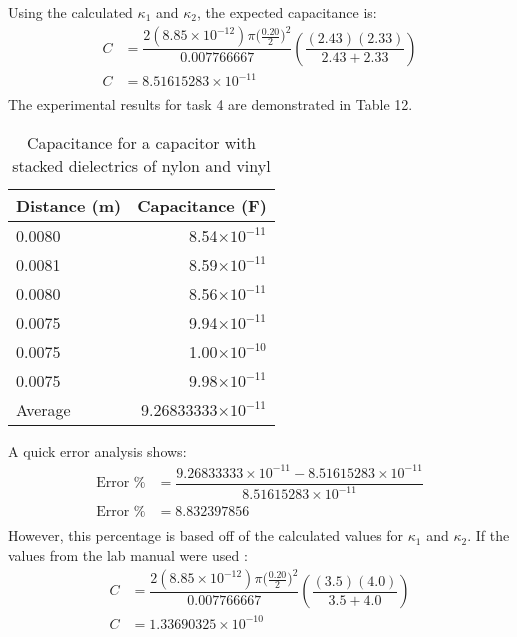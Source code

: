 \documentclass [12pt, letterpaper, twoside] {article}
\begin{document}
\begin{enumerate}
  Using the calculated \(\kappa_{1}\) and \(\kappa_{2}\), the expected capacitance is:
  \begin{equation*}
    \begin{split}
      C &= \dfrac{2(8.85\times10^{-12})\pi{(\tfrac{0.20}{2}})^2}{0.007766667}\left(\dfrac{(2.43)(2.33)}{2.43 + 2.33}\right) \\
      C &= 8.51615283\times10^{-11} \\
    \end{split}
  \end{equation*}
  The experimental results for task 4 are demonstrated in Table 12. 
  \begin{table}[h!]
    \centering
    \begin{tabular}{| l | r |}
      \hline\hline
      Distance (m) & Capacitance (F) \\
      \hline
      0.0080 & 8.54\(\times10^{-11}\) \\
      \hline
      0.0081 & 8.59\(\times10^{-11}\) \\
      \hline
      0.0080 & 8.56\(\times10^{-11}\) \\
      \hline
      0.0075 & 9.94\(\times10^{-11}\) \\
      \hline
      0.0075 & 1.00\(\times10^{-10}\) \\
      \hline
      0.0075 & 9.98\(\times10^{-11}\) \\
      \hline
      Average & 9.26833333\(\times10^{-11}\) \\
      \hline
      \hline\hline
    \end{tabular}
    \caption{Capacitance for a capacitor with stacked dielectrics of nylon and vinyl}
  \end{table} 
  A quick error analysis shows:
  \begin{equation*}
    \begin{split}
      \text{Error \%} &= \dfrac{9.26833333\times10^{-11} - 8.51615283\times10^{-11}}{8.51615283\times10^{-11}} \\
      \text{Error \%} &= 8.832397856 \\
    \end{split}
  \end{equation*}
  However, this percentage is based off of the calculated values for \(\kappa_{1}\) and \(\kappa_{2}\). If the values from the lab manual were used \cite{labManual}:
  \begin{equation*}
    \begin{split}
      C &= \dfrac{2(8.85\times10^{-12})\pi{(\tfrac{0.20}{2}})^2}{0.007766667}\left(\dfrac{(3.5)(4.0)}{3.5 + 4.0}\right) \\
      C &= 1.33690325\times10^{-10} \\
    \end{split}
  \end{equation*}


\end{enumerate}
\end{document}
